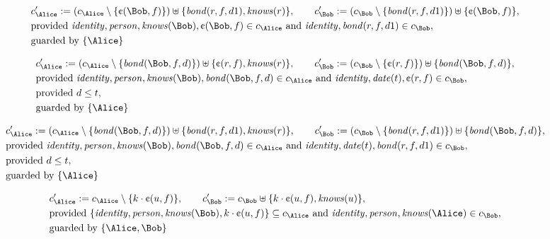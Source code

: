 \begin{align*}
&
c'_
{
\Alice
}
 := 
(c_
{
\Alice
}
 \setminus 
\{
\text{\textcent}
(
\Bob
,
f
)
\}
) \uplus 
\{
\mathit{
bond
}
(
r
,
f
,
d1
)
,
\mathit{
knows
}
(
r
)
\}
, \qquad 
c'_
{
\Bob
}
 := 
(c_
{
\Bob
}
 \setminus 
\{
\mathit{
bond
}
(
r
,
f
,
d1
)
\}
) \uplus 
\{
\text{\textcent}
(
\Bob
,
f
)
\}
,\\
&
\text{provided } 
\mathit{
identity
}
,
\mathit{
person
}
,
\mathit{
knows
}
(
\Bob
)
,
\text{\textcent}
(
\Bob
,
f
)
 \in c_
{
\Alice
}
 \text{ and } 
\mathit{
identity
}
,
\mathit{
bond
}
(
r
,
f
,
d1
)
 \in c_
{
\Bob
}
,\\
&
\text{guarded by } \{
\Alice
\}
\end{align*}

\begin{align*}
&
c'_
{
\Alice
}
 := 
(c_
{
\Alice
}
 \setminus 
\{
\mathit{
bond
}
(
\Bob
,
f
,
d
)
\}
) \uplus 
\{
\text{\textcent}
(
r
,
f
)
,
\mathit{
knows
}
(
r
)
\}
, \qquad 
c'_
{
\Bob
}
 := 
(c_
{
\Bob
}
 \setminus 
\{
\text{\textcent}
(
r
,
f
)
\}
) \uplus 
\{
\mathit{
bond
}
(
\Bob
,
f
,
d
)
\}
,\\
&
\text{provided } 
\mathit{
identity
}
,
\mathit{
person
}
,
\mathit{
knows
}
(
\Bob
)
,
\mathit{
bond
}
(
\Bob
,
f
,
d
)
 \in c_
{
\Alice
}
 \text{ and } 
\mathit{
identity
}
,
\mathit{
date
}
(
t
)
,
\text{\textcent}
(
r
,
f
)
 \in c_
{
\Bob
}
,\\
&
\text{provided } 
d
\le
t
,\\
&
\text{guarded by } \{
\Alice
\}
\end{align*}

\begin{align*}
&
c'_
{
\Alice
}
 := 
(c_
{
\Alice
}
 \setminus 
\{
\mathit{
bond
}
(
\Bob
,
f
,
d
)
\}
) \uplus 
\{
\mathit{
bond
}
(
r
,
f
,
d1
)
,
\mathit{
knows
}
(
r
)
\}
, \qquad 
c'_
{
\Bob
}
 := 
(c_
{
\Bob
}
 \setminus 
\{
\mathit{
bond
}
(
r
,
f
,
d1
)
\}
) \uplus 
\{
\mathit{
bond
}
(
\Bob
,
f
,
d
)
\}
,\\
&
\text{provided } 
\mathit{
identity
}
,
\mathit{
person
}
,
\mathit{
knows
}
(
\Bob
)
,
\mathit{
bond
}
(
\Bob
,
f
,
d
)
 \in c_
{
\Alice
}
 \text{ and } 
\mathit{
identity
}
,
\mathit{
date
}
(
t
)
,
\mathit{
bond
}
(
r
,
f
,
d1
)
 \in c_
{
\Bob
}
,\\
&
\text{provided } 
d
\le
t
,\\
&
\text{guarded by } \{
\Alice
\}
\end{align*}

\begin{align*}
&
c'_
{
\Alice
}
 := 
c_
{
\Alice
}
 \setminus 
\{
k
\cdot
\text{\textcent}
(
u
,
f
)
\}
, \qquad 
c'_
{
\Bob
}
 := 
c_
{
\Bob
}
 \uplus 
\{
k
\cdot
\text{\textcent}
(
u
,
f
)
,
\mathit{
knows
}
(
u
)
\}
,\\
&
\text{provided } 
\{
\mathit{
identity
}
,
\mathit{
person
}
,
\mathit{
knows
}
(
\Bob
)
,
k
\cdot
\text{\textcent}
(
u
,
f
)
\}
 \subseteq c_
{
\Alice
}
 \text{ and } 
\mathit{
identity
}
,
\mathit{
person
}
,
\mathit{
knows
}
(
\Alice
)
 \in c_
{
\Bob
}
,\\
&
\text{guarded by } \{
\Alice
,
\Bob
\}
\end{align*}
